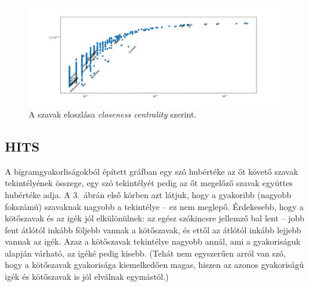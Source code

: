 \documentclass{llncs}
\newcommand{\embf}[1]{\textbf{#1}}
\newcommand{\liex}[1]{\emph{#1}}
\newcommand{\XXX}[1]{{\small \color{megjcolor} [XXX #1]}}
\begin{document}
\begin{figure}
\begin{center}
\includegraphics[width=25cm]{current-flow-closeness.png}
\caption{A szavak eloszlása \emph{closeness centrality} szerint.}
\end{center}
\label{fig:closeness}
\end{figure}

\subsection{HITS}

A bigramgyakorliságokból épített gráfban egy szó hubértéke az őt követő szavak
tekintélyének összege, egy szó tekintélyét pedig az őt megelőző szavak együttes
hubértéke adja.
A 3.~ábrán első körben azt látjuk, hogy a gyakoribb (nagyobb fokszámú)
szavaknak nagyobb a tekintélye -- ez nem meglepő. Érdekesebb, hogy a kötőszavak
és az igék jól elkülönülnek:
az egész szókincsre jellemző bal lent -- jobb fent átlótól inkább följebb vannak a kötőszavak,
és ettől az átlótól inkább lejjebb vannak az igék.
Azaz a kötőszavak tekintélye nagyobb annál, ami a gyakoriságuk alapján várható,
az igéké pedig kisebb.
%
(Tehát nem egyszerűen arról van szó,
hogy a kötőszavak gyakorisága kiemelkedően magas,
hiszen az azonos gyakoriságú igék és kötőszavak is jól elválnak egymástól.)
\end{document}

